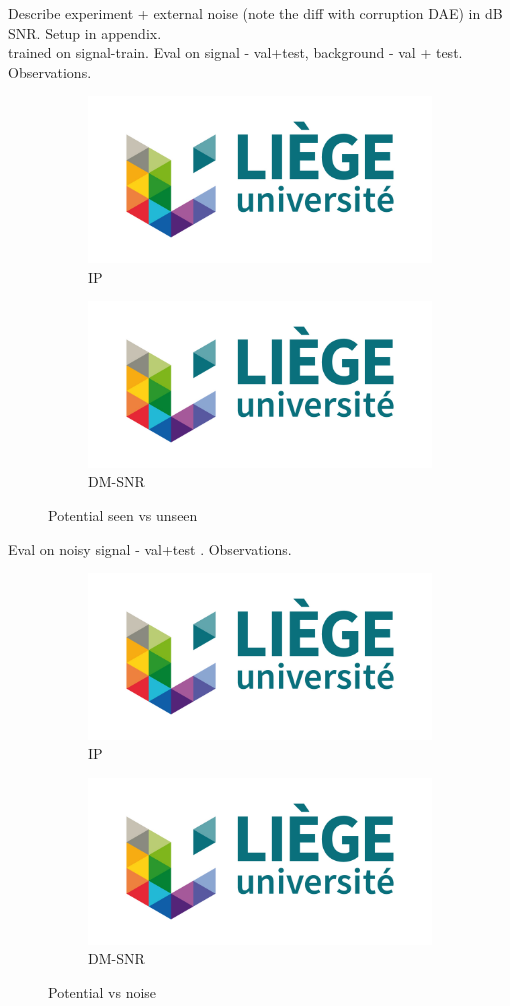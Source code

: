 Describe experiment + external noise (note the diff with corruption DAE) in dB SNR. Setup in appendix.\\

trained on signal-train. Eval on signal - val+test, background - val + test. Observations.

\begin{figure}[!h]
\centering
\begin{subfigure}{.5\textwidth}
  \centering
  \includegraphics[width=.4\linewidth]{figures/logo-uliege}
  \caption{IP}
  \label{fig:dae}
\end{subfigure}%
\begin{subfigure}{.5\textwidth}
  \centering
  \includegraphics[width=.4\linewidth]{figures/logo-uliege}
  \caption{DM-SNR}
  \label{fig:dae-process}
\end{subfigure}
\caption{Potential seen vs unseen}
\end{figure}

Eval on noisy signal - val+test . Observations.

\begin{figure}[!h]
\centering
\begin{subfigure}{.5\textwidth}
  \centering
  \includegraphics[width=.4\linewidth]{figures/logo-uliege}
  \caption{IP}
  \label{fig:dae}
\end{subfigure}%
\begin{subfigure}{.5\textwidth}
  \centering
  \includegraphics[width=.4\linewidth]{figures/logo-uliege}
  \caption{DM-SNR}
  \label{fig:dae-process}
\end{subfigure}
\caption{Potential vs noise}
\end{figure}

